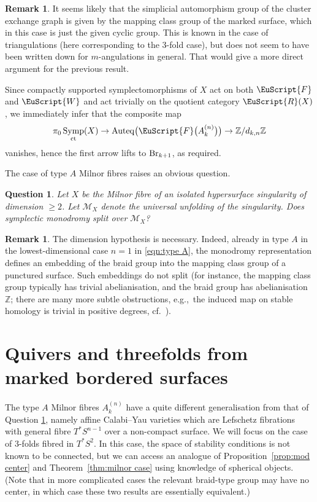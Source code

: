 \documentclass[pdftex]{sigma}
\DeclareMathOperator{\Auteq}{Auteq}
\def\scrR{\EuScript{R}}
\newcommand{\scrF}{\EuScript{F}}
\def\scrW{\EuScript{W}}
\DeclareMathOperator{\Symp}{Symp}
\def\bZ{\mathbb{Z}}
\newtheorem{qn}[thm]{Question}
\theoremstyle{definition}
\newtheorem{rmk}[thm]{Remark}
\numberwithin{equation}{section}
\begin{document}
\begin{rmk}
 It seems likely that the simplicial automorphism group of the cluster exchange graph is given by the mapping class group of the marked surface, which in this case is just the given cyclic group. This is known in the case of triangulations (here corresponding to the 3-fold case), but does not seem to have been written down for $m$-angulations in general. That would give a more direct argument for the previous result.
\end{rmk}

Since compactly supported symplectomorphisms of $X$ act on both $\scrF$ and $\scrW$ and act trivially on the quotient category $\scrR(X)$, we immediately infer that the composite map
\[
\pi_0\Symp_{\rm ct}(X) \to \Auteq\bigl(\scrF\bigl(A_k^{(n)}\bigr)\bigr) \to \bZ/d_{k,n}\bZ
\]
vanishes, hence the first arrow lifts to ${\rm Br}_{k+1}$, as required.

The case of type $A$ Milnor fibres raises an obvious question.

\begin{qn}\label{qn:general-Milnor}
 Let $X$ be the Milnor fibre of an isolated hypersurface singularity of dimension $\geq 2$. Let $\mathcal{M}_X$ denote the universal unfolding of the singularity. Does symplectic monodromy split over $\mathcal{M}_X$?
\end{qn}

\begin{rmk}
 The dimension hypothesis is necessary. Indeed, already in type $A$ in the lowest-dimensional case $n=1$ in \eqref{eqn:type A}, the monodromy representation defines an embedding of the braid group into the mapping class group of a punctured surface. Such embeddings do not split (for instance, the mapping class group typically has trivial abelianisation, and the braid group has abelianisation $\bZ$; there are many more subtle obstructions, e.g.,~the induced map on stable homology is trivial in positive degrees, cf.~\cite{Song-Tillmann}).
\end{rmk}

\section{Quivers and threefolds from marked bordered surfaces}\label{sec:marked-bordered-surfaces}

The type $A$ Milnor fibres $A_k^{(n)}$ have a quite different generalisation from that of Question \ref{qn:general-Milnor}, namely affine Calabi--Yau varieties which are Lefschetz fibrations with general fibre $T^*S^{n-1}$ over a non-compact surface.
We will focus on the case of $3$-folds fibred in $T^*S^2$. In this case, the space of stability conditions is not known to be connected, but we can access an analogue of Proposition~\ref{prop:mod center} and Theorem~\ref{thm:milnor case} using knowledge of spherical objects. (Note that in more complicated cases the relevant braid-type group may have no center, in which case these two results are essentially equivalent.)
\end{document}
